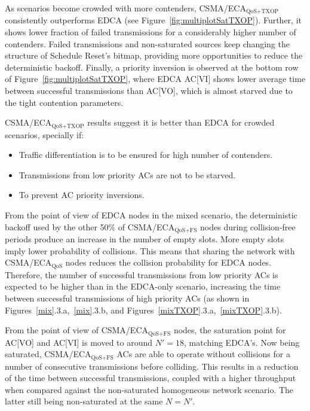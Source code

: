 \documentclass[a4paper]{article}
\begin{document}
As scenarios become crowded with more contenders, CSMA/ECA$_\text{QoS+TXOP}$ consistently outperforms EDCA (see Figure~\ref{fig:multiplotSatTXOP}). Further, it shows lower fraction of failed transmissions for a considerably higher number of contenders. Failed transmissions and non-saturated sources keep changing the structure of Schedule Reset's bitmap, providing more opportunities to reduce the deterministic backoff. Finally, a priority inversion is observed at the bottom row of Figure~\ref{fig:multiplotSatTXOP}, where EDCA AC[VI] shows lower average time between successful transmissions than AC[VO], which is almost starved due to the tight contention parameters.

CSMA/ECA$_\text{QoS+TXOP}$ results suggest it is better than EDCA for crowded scenarios, specially if:
	\begin{itemize}
		\item Traffic differentiation is to be ensured for high number of contenders.
		\item Transmissions from low priority ACs are not to be starved.
		\item To prevent AC priority inversions.
	\end{itemize}

From the point of view of EDCA nodes in the mixed scenario, the deterministic backoff used by the other 50\% of CSMA/ECA$_{\text{QoS+FS}}$ nodes during collision-free periods produce an increase in the number of empty slots. More empty slots imply lower probability of collisions. This means that sharing the network with CSMA/ECA$_{\text{QoS}}$ nodes reduces the collision probability for EDCA nodes. Therefore, the number of successful transmissions from low priority ACs is expected to be higher than in the EDCA-only scenario, increasing the time between successful transmissions of high priority ACs (as shown in Figures~\ref{mix}.3.a,~\ref{mix}.3.b, and Figures~\ref{mixTXOP}.3.a,~\ref{mixTXOP}.3.b).

From the point of view of CSMA/ECA$_{\text{QoS+FS}}$ nodes, the saturation point for AC[VO] and AC[VI] is moved to around $N'=18$, matching EDCA's. Now being saturated, CSMA/ECA$_{\text{QoS+FS}}$ ACs are able to operate without collisions for a number of consecutive transmissions before colliding. This results in a reduction of the time between successful transmissions, coupled with a higher throughput when compared against the non-saturated homogeneous network scenario. The latter still being non-saturated at the same $N=N'$.
\end{document}
